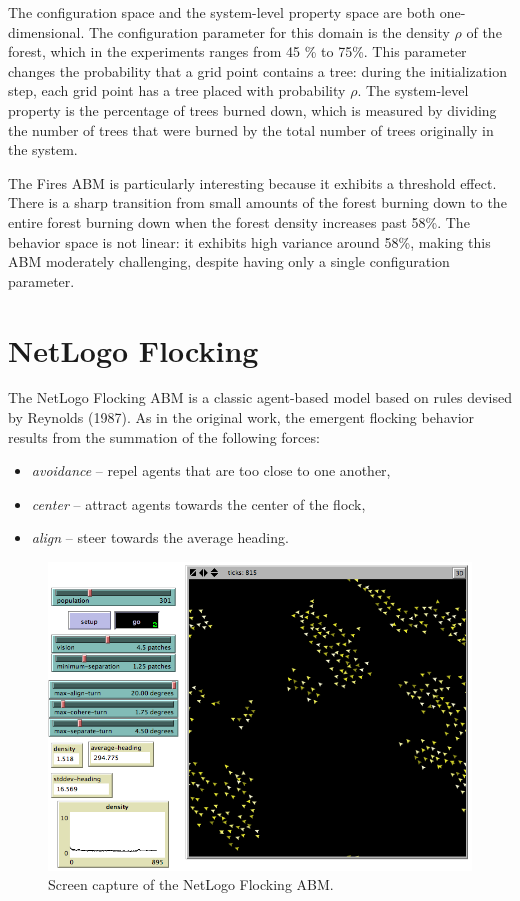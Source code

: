 The configuration space and the system-level property space are both one-dimensional.
The configuration parameter for this domain is the density $\rho$ of the forest, which in the experiments ranges from 45 \% to 75\%.
This parameter changes the probability that a grid point contains a tree:
during the initialization step, each grid point has a tree placed with probability $\rho$.
The system-level property is the percentage of trees burned down, which is measured by dividing the number of trees that were burned by the total number of trees originally in the system.


The Fires ABM is particularly interesting because it exhibits a threshold effect.
There is a sharp transition from small amounts of the forest burning down to the entire forest burning down when the forest density increases past 58\%.
The behavior space is not linear: it exhibits high variance around 58\%, making this ABM moderately challenging, despite having only a single configuration parameter.


 \section{NetLogo Flocking}

The NetLogo Flocking ABM is a classic agent-based model based on rules devised by Reynolds (1987)\nocite{reynolds1987}.
As in the original work, the emergent flocking behavior results from the summation of the following forces:
\begin{itemize}
	\item \textit{avoidance} -- repel agents that are too close to one another,
	\item \textit{center} -- attract agents towards the center of the flock,
	\item \textit{align} -- steer towards the average heading.
\end{itemize}

\begin{figure}[ht]
\centering
\includegraphics[scale=.5]{images/flocking_ss.png}
\caption{Screen capture of the NetLogo Flocking ABM.}
\label{fig:flockingss}
\end{figure}

